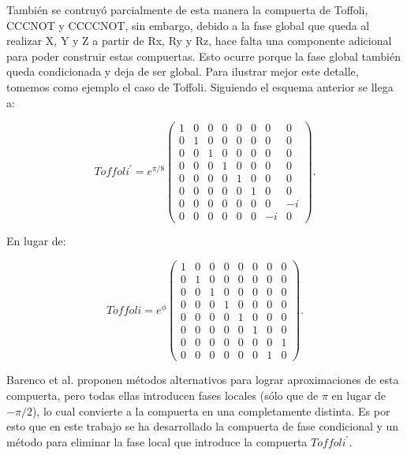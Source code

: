 También se contruyó parcialmente de esta manera la compuerta de Toffoli, CCCNOT y CCCCNOT, sin embargo, debido a la fase global que queda al realizar X, Y y Z a partir de Rx, Ry y Rz, hace falta una componente adicional para poder construir estas compuertas. Esto ocurre porque la fase global también queda condicionada y deja de ser global. Para ilustrar mejor este detalle, tomemos como ejemplo el caso de Toffoli. Siguiendo el esquema anterior se llega a:

\begin{equation}
    Toffoli^\prime =
    e^{\pi/8}
    \begin{pmatrix}
        1 & 0 & 0 & 0 & 0 & 0 & 0 & 0 \\
        0 & 1 & 0 & 0 & 0 & 0 & 0 & 0 \\
        0 & 0 & 1 & 0 & 0 & 0 & 0 & 0 \\
        0 & 0 & 0 & 1 & 0 & 0 & 0 & 0 \\
        0 & 0 & 0 & 0 & 1 & 0 & 0 & 0 \\
        0 & 0 & 0 & 0 & 0 & 1 & 0 & 0 \\
        0 & 0 & 0 & 0 & 0 & 0 & 0 & -i \\
        0 & 0 & 0 & 0 & 0 & 0 & -i & 0
    \end{pmatrix} .
\end{equation}

En lugar de:

\begin{equation}
    Toffoli =
    e^{\phi}
    \begin{pmatrix}
        1 & 0 & 0 & 0 & 0 & 0 & 0 & 0 \\
        0 & 1 & 0 & 0 & 0 & 0 & 0 & 0 \\
        0 & 0 & 1 & 0 & 0 & 0 & 0 & 0 \\
        0 & 0 & 0 & 1 & 0 & 0 & 0 & 0 \\
        0 & 0 & 0 & 0 & 1 & 0 & 0 & 0 \\
        0 & 0 & 0 & 0 & 0 & 1 & 0 & 0 \\
        0 & 0 & 0 & 0 & 0 & 0 & 0 & 1 \\
        0 & 0 & 0 & 0 & 0 & 0 & 1 & 0
    \end{pmatrix} .
\end{equation}

Barenco et al. proponen métodos alternativos para lograr aproximaciones de esta compuerta, pero todas ellas introducen fases locales (sólo que de $\pi$ en lugar de $-\pi/2$), lo cual convierte a la compuerta en una completamente distinta. Es por esto que en este trabajo se ha desarrollado la compuerta de fase condicional y un método para eliminar la fase local que introduce la compuerta $Toffoli^\prime$.

